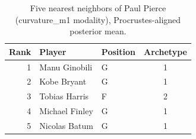 \begin{table}[htbp]
  \centering\small
  \begin{tabular}{rllc}
    \toprule
    Rank & Player & Position & Archetype \\
    \midrule
    1 & Manu Ginobili & G & 1 \\
    2 & Kobe Bryant & G & 1 \\
    3 & Tobias Harris & F & 2 \\
    4 & Michael Finley & G & 1 \\
    5 & Nicolas Batum & G & 1 \\
    \bottomrule
  \end{tabular}
  \caption{Five nearest neighbors of Paul Pierce (curvature_m1 modality), Procrustes-aligned posterior mean.}
  \label{tab:Paul_Pierce_neighbors_curvature_m1}
\end{table}

